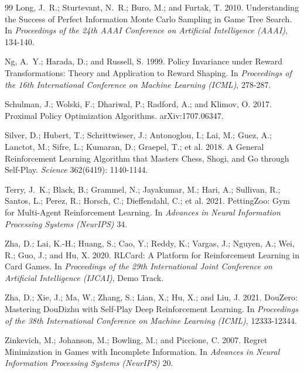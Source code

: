 \begin{thebibliography}{99}
Long, J.~R.; Sturtevant, N.~R.; Buro, M.; and Furtak, T. 2010. Understanding the Success of Perfect Information Monte Carlo Sampling in Game Tree Search. In \emph{Proceedings of the 24th AAAI Conference on Artificial Intelligence (AAAI)}, 134-140.

Ng, A.~Y.; Harada, D.; and Russell, S. 1999. Policy Invariance under Reward Transformations: Theory and Application to Reward Shaping. In \emph{Proceedings of the 16th International Conference on Machine Learning (ICML)}, 278-287.

Schulman, J.; Wolski, F.; Dhariwal, P.; Radford, A.; and Klimov, O. 2017. Proximal Policy Optimization Algorithms. arXiv:1707.06347.

Silver, D.; Hubert, T.; Schrittwieser, J.; Antonoglou, I.; Lai, M.; Guez, A.; Lanctot, M.; Sifre, L.; Kumaran, D.; Graepel, T.; et al. 2018. A General Reinforcement Learning Algorithm that Masters Chess, Shogi, and Go through Self-Play. \emph{Science} 362(6419): 1140-1144.

Terry, J.~K.; Black, B.; Grammel, N.; Jayakumar, M.; Hari, A.; Sullivan, R.; Santos, L.; Perez, R.; Horsch, C.; Dieffendahl, C.; et al. 2021. PettingZoo: Gym for Multi-Agent Reinforcement Learning. In \emph{Advances in Neural Information Processing Systems (NeurIPS)} 34.

Zha, D.; Lai, K.-H.; Huang, S.; Cao, Y.; Reddy, K.; Vargas, J.; Nguyen, A.; Wei, R.; Guo, J.; and Hu, X. 2020. RLCard: A Platform for Reinforcement Learning in Card Games. In \emph{Proceedings of the 29th International Joint Conference on Artificial Intelligence (IJCAI)}, Demo Track.

Zha, D.; Xie, J.; Ma, W.; Zhang, S.; Lian, X.; Hu, X.; and Liu, J. 2021. DouZero: Mastering DouDizhu with Self-Play Deep Reinforcement Learning. In \emph{Proceedings of the 38th International Conference on Machine Learning (ICML)}, 12333-12344.

Zinkevich, M.; Johanson, M.; Bowling, M.; and Piccione, C. 2007. Regret Minimization in Games with Incomplete Information. In \emph{Advances in Neural Information Processing Systems (NeurIPS)} 20.

\end{thebibliography}
